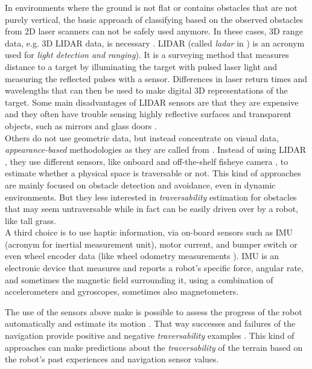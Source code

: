 \documentclass[12pt,a4paper]{report}
\newcommand{\term}{\textit}
\newcommand{\acronym}{\MakeUppercase}
\begin{document}
	In environments where the ground is not flat or contains obstacles that are 
	not purely vertical, the basic approach of classifying based on the observed 
	obstacles from \acronym{2d} laser scanners can not be safely used anymore. 
	In these cases, \acronym{3d} range data, e.g. \acronym{3d} \acronym{lidar} 
	data, is necessary \cite{Suger, Lalonde}. \acronym{lidar} (called \term{ladar} 
	in \cite{Lalonde, Shneier}) is an acronym used for \term{light detection and 
	ranging}). It is a surveying method that measures distance to a target by 
	illuminating the target with pulsed laser light and measuring the reflected 
	pulses with a sensor. Differences in laser return times and wavelengths that 
	can then be used to make digital \acronym{3d} representations of the target.
	Some main disadvantages of \acronym{lidar} sensors are that they are expensive 
	and they often have trouble sensing highly reflective surfaces and transparent 
	objects, such as mirrors and glass doors \cite{HiroseGonet}.
	\\
	
	Others do not use geometric data, but instead concentrate on visual data, 
	\term{appearance-based} methodologies as they are called from \cite{Papadakis}. 
	Instead of using \acronym{lidar} \cite{Lalonde, Suger}, they use different 
	sensors, like onboard and off-the-shelf fisheye camera \cite{Hirose, HiroseGonet}, 
	to estimate whether a physical space is traversable or not. This kind of 
	approaches are mainly focused on obstacle detection and avoidance, even in 
	dynamic environments. But they less interested in \term{traversability} 
	estimation for obstacles that may seem untraversable while in fact can be 
	easily driven over by a robot, like tall grass.
	\\
	
	A third choice is to use haptic information, via on-board sensors such as 
	\acronym{imu} (acronym for inertial measurement unit), motor current, and bumper 
	switch \cite{Kim} or even wheel encoder data \cite{Lee} (like wheel odometry 
	measurements \cite{Droeschel}). \acronym{imu} is an electronic device that 
	measures and reports a robot's specific force, angular rate, and sometimes the 
	magnetic field surrounding it, using a combination of accelerometers and 
	gyroscopes, sometimes also magnetometers. 
	\par
	The use of the sensors above make is possible to assess the progress of the 
	robot automatically and estimate its motion \cite{Droeschel}. That way successes 
	and failures of the navigation provide positive and negative \term{traversability} 
	examples \cite{Kim}. This kind of approaches can make predictions about the 
	\term{traversability} of the terrain based on the robot's past experiences and 
	navigation sensor values.
	\\
	
\end{document}
